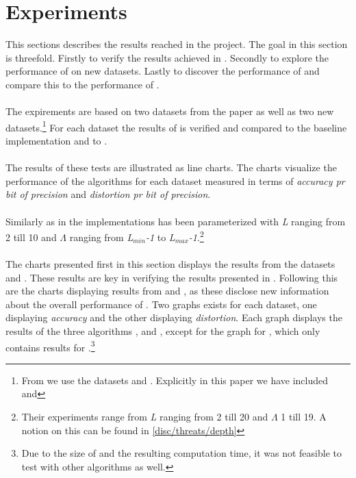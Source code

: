 \section{Experiments} %
\label{results}
This sections describes the results reached in the project. The goal in this section is threefold. Firstly to verify the results achieved in \cite{wagner17}. Secondly to explore the performance of \qs{} on new datasets. Lastly to discover the performance of \qsr{} and compare this to the performance of \qs{}. 
\\
\\
The expirements are based on two datasets from the paper as well as two new datasets.\footnote{From \cite{wagner17} we use the datasets \sift{} and \mnist{}. Explicitly in this paper we have included \clust{} and \gist{}} For each dataset the results of \qs{} is verified and compared to the baseline implementation \gr{} and to \qsr{}. 
\\
\\
The results of these tests are illustrated as line charts. The charts visualize the performance of the algorithms for each dataset measured in terms of \textit{accuracy pr bit of precision} and \textit{distortion pr bit of precision}. 
\\
\\
Similarly as in \cite{wagner17} the \qs{} implementations has been parameterized with \textit{L} ranging from 2 till 10 and $\Lambda$ ranging from \textit{L$_{min}$-1} to \textit{L$_{max}$-1}.\footnote{Their experiments range from \textit{L} ranging from 2 till 20 and $\Lambda$ 1 till 19. A notion on this can be found in \ref{disc/threats/depth}} 
\\
\\
The charts presented first in this section displays the results from the datasets \sift{} and \mnist{}. These results are key in verifying the results presented in \cite{wagner17}. Following this are the charts displaying results from \clust{} and \gist{}, as these disclose new information about the overall performance of \qs{}. Two graphs exists for each dataset, one displaying \textit{accuracy} and the other displaying \textit{distortion}. Each graph displays the results of the three algorithms \qs{}, \qsr{} and \grid{}, except for the graph for \gist{}, which only contains results for \qs{}.\footnote{Due to the size of \gist{} and the resulting computation time, it was not feasible to test with other algorithms as well. }

